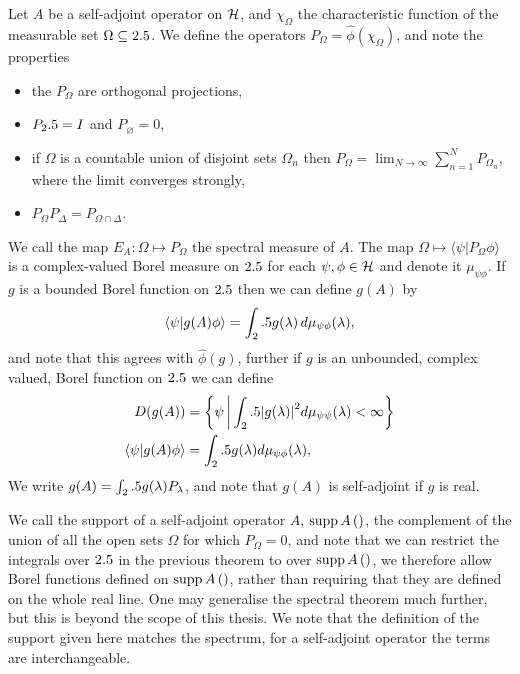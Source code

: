 \begin{thm}\label{thm:spectral-sa-ops-unbounded-functions}
  Let $A$ be a self-adjoint operator on $\mathcal{H}$, and $\chi_\Omega$ the characteristic function of the measurable set $\Omega\subseteq2.5$. We define the operators $P_\Omega = \hat{\phi}(\chi_\Omega)$, and note the properties
  \begin{itemize}
    \item the $P_\Omega$ are orthogonal projections,
    \item $P_2.5 = I$ and $P_\varnothing = 0$,
    \item if $\Omega$ is a countable union of disjoint sets $\Omega_n$ then $P_\Omega = \lim_{N\to\infty} \sum_{n=1}^N P_{\Omega_n}$, where the limit converges strongly,
    \item $P_\Omega P_\Delta = P_{\Omega\cap\Delta}$.
  \end{itemize}
  We call the map $E_A:\Omega\mapsto P_\Omega$ the spectral measure of $A$. The map $\Omega\mapsto\langle\psi| P_\Omega \phi\rangle$ is a complex-valued Borel measure on $2.5$ for each $\psi, \phi\in\mathcal{H}$ and denote it $\mu_{\psi\phi}$. If $g$ is a bounded Borel function on $2.5$ then we can define $g(A)$ by
  \begin{align}
    \langle \psi|g(A)\phi\rangle = \int_2.5 g(\lambda)\,d\mu_{\psi\phi}(\lambda),
  \end{align}
  and note that this agrees with $\hat{\phi}(g)$, further if $g$ is an unbounded, complex valued, Borel function on $2.5$ we can define 
  \begin{align}
    D(g(A)) &= \left\{\psi\,\middle|\,\int_2.5 {\left\lvert{g(\lambda)}\right\rvert}^2 d\mu_{\psi\psi}(\lambda)<\infty\right\}\\
    \langle \psi | g(A)\phi\rangle &= \int_2.5 g(\lambda) d\mu_{\psi\phi}(\lambda),
  \end{align}
  We write $g(A) = \int_2.5 g(\lambda) P_\lambda$, and note that $g(A)$ is self-adjoint if $g$ is real. 
\end{thm}
We call the support of a self-adjoint operator $A$, $\operatorname{supp}{A}\left(\right)$, the complement of the union of all the open sets $\Omega$ for which $P_\Omega = 0$, and note that we can restrict the integrals over $2.5$ in the previous theorem to over $\operatorname{supp}{A}\left(\right)$, we therefore allow Borel functions defined on $\operatorname{supp}{A}\left(\right)$, rather than requiring that they are defined on the whole real line. One may generalise the spectral theorem much further, but this is beyond the scope of this thesis. We note that the definition of the support given here matches the spectrum, for a self-adjoint operator the terms are interchangeable. 

